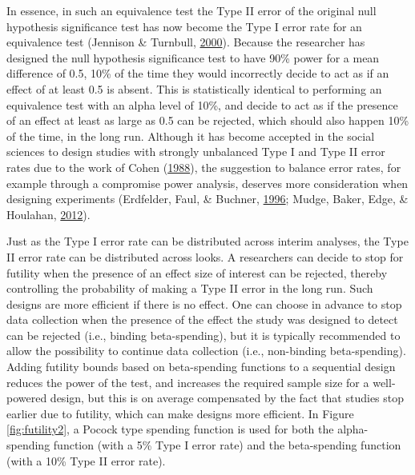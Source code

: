 \documentclass[
  english,
  ,jou, a4paper,floatsintext]{apa6}
\begin{document}
In essence, in such an equivalence test the Type II error of the original null hypothesis significance test has now become the Type I error rate for an equivalence test (Jennison \& Turnbull, \protect\hyperlink{ref-jennison_group_2000}{2000}). Because the researcher has designed the null hypothesis significance test to have 90\% power for a mean difference of 0.5, 10\% of the time they would incorrectly decide to act as if an effect of at least 0.5 is absent. This is statistically identical to performing an equivalence test with an alpha level of 10\%, and decide to act as if the presence of an effect at least as large as 0.5 can be rejected, which should also happen 10\% of the time, in the long run. Although it has become accepted in the social sciences to design studies with strongly unbalanced Type I and Type II error rates due to the work of Cohen (\protect\hyperlink{ref-cohen_statistical_1988}{1988}), the suggestion to balance error rates, for example through a compromise power analysis, deserves more consideration when designing experiments (Erdfelder, Faul, \& Buchner, \protect\hyperlink{ref-erdfelder_gpower_1996}{1996}; Mudge, Baker, Edge, \& Houlahan, \protect\hyperlink{ref-mudge_setting_2012}{2012}).

Just as the Type I error rate can be distributed across interim analyses, the Type II error rate can be distributed across looks. A researchers can decide to stop for futility when the presence of an effect size of interest can be rejected, thereby controlling the probability of making a Type II error in the long run. Such designs are more efficient if there is no effect. One can choose in advance to stop data collection when the presence of the effect the study was designed to detect can be rejected (i.e., binding beta-spending), but it is typically recommended to allow the possibility to continue data collection (i.e., non-binding beta-spending). Adding futility bounds based on beta-spending functions to a sequential design reduces the power of the test, and increases the required sample size for a well-powered design, but this is on average compensated by the fact that studies stop earlier due to futility, which can make designs more efficient. In Figure \ref{fig:futility2}, a Pocock type spending function is used for both the alpha-spending function (with a 5\% Type I error rate) and the beta-spending function (with a 10\% Type II error rate).
\end{document}
